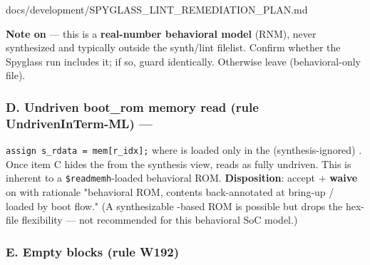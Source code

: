 \begin{relocated}{docs/development/SPYGLASS_LINT_REMEDIATION_PLAN.md}
{}

\textbf{Note on  } --- this is a
\textbf{real-number behavioral model} (RNM), never synthesized and
typically outside the synth/\allowbreak{}lint filelist. Confirm whether
the Spyglass run includes it; if so, guard identically. Otherwise leave
(behavioral-only file).

\subsubsection{\texorpdfstring{D. Undriven boot\_rom memory read (rule
UndrivenInTerm-ML) ---
}{D. Undriven boot\_rom memory read (rule UndrivenInTerm-ML) --- }}\label{um:guide:spyglass-lint-remediation:d-undriven-boot-rom-memory-read-rule-undriveninterm-ml-rtlsocboot-romsv224}

\texttt{assign\ s\_\allowbreak{}rdata\ =\allowbreak{}\ mem[r\_\allowbreak{}idx];}
where  is loaded only in the (synthesis-ignored)
. Once item C hides the  from the synthesis
view,  reads as fully undriven. This is inherent to a
\texttt{\$readmemh}-loaded behavioral ROM. \textbf{Disposition}: accept
+ \textbf{waive}  on
 with rationale "behavioral ROM, contents
back-annotated at bring-up / loaded by boot flow." (A synthesizable
-based ROM is possible but drops the hex-file flexibility ---
not recommended for this behavioral SoC model.)

\subsubsection{E. Empty blocks (rule W192)}\label{um:guide:spyglass-lint-remediation:e-empty-blocks-rule-w192}

{\footnotesize\setlength{\tabcolsep}{3pt}

}
\end{relocated}
